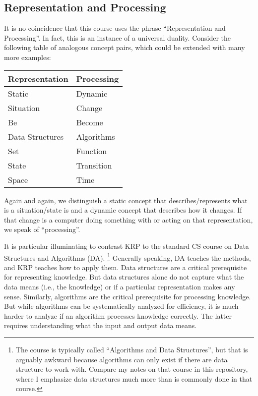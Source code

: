 \subsection{Representation and Processing}

It is no coincidence that this course uses the phrase ``Representation and Processing''.
In fact, this is an instance of a universal duality.
Consider the following table of analogous concept pairs, which could be extended with many more examples:

\begin{center}
\begin{tabular}{l|l}
Representation & Processing \\
\hline
Static & Dynamic \\
Situation & Change \\
Be & Become \\
Data Structures & Algorithms \\
Set & Function \\
State & Transition \\
Space & Time
\end{tabular}
\end{center}

Again and again, we distinguish a static concept that describes/represents what is a situation/state is and a dynamic concept that describes how it changes.
If that change is a computer doing something with or acting on that representation, we speak of ``processing''.

It is particular illuminating to contrast KRP to the standard CS course on Data Structures and Algorithms (DA).%
\footnote{The course is typically called ``Algorithms and Data Structures'', but that is arguably awkward because algorithms can only exist if there are data structure to work with. Compare my notes on that course in this repository, where I emphasize data structures much more than is commonly done in that course.}
Generally speaking, DA teaches the methods, and KRP teaches how to apply them.
Data structures are a critical prerequisite for representing knowledge.
But data structures alone do not capture what the data means (i.e., the knowledge) or if a particular representation makes any sense.
Similarly, algorithms are the critical prerequisite for processing knowledge.
But while algorithms can be systematically analyzed for efficiency, it is much harder to analyze if an algorithm processes knowledge correctly.
The latter requires understanding what the input and output data means.

